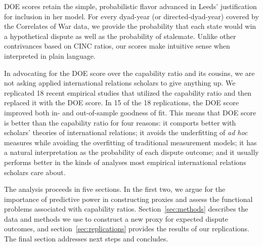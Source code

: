 DOE scores retain the simple, probabilistic flavor advanced in Leeds' justification for inclusion in her model. 
For every dyad-year (or directed-dyad-year) covered by the Correlates of War data, we provide the probability that each state would win a hypothetical dispute as well as the probability of stalemate. 
Unlike other contrivances based on CINC ratios, our scores make intuitive sense when interpreted in plain language.

In advocating for the DOE score over the capability ratio and its cousins, we are not asking applied international relations scholars to give anything up. 
We replicated 18 recent empirical studies that utilized the capability ratio and then replaced it with the DOE score. 
In 15 of the 18 replications, the DOE score improved both in- and out-of-sample goodness of fit.
This means that DOE score is better than the capability ratio for four reasons: it comports better with scholars' theories of international relations; it avoids the underfitting of \emph{ad hoc} measures while avoiding the overfitting of traditional measurement models; it has a natural interpretation as the probability of each dispute outcome; and it usually performs better in the kinds of analyses most empirical international relations scholars care about.

The analysis proceeds in five sections.
In the first two, we argue for the importance of predictive power in constructing proxies and assess the functional problems associated with capability ratios.
Section~\ref{sec:methods} describes the data and methods we use to construct a new proxy for expected dispute outcomes, and section~\ref{sec:replications} provides the results of our replications.
The final section addresses next steps and concludes.

